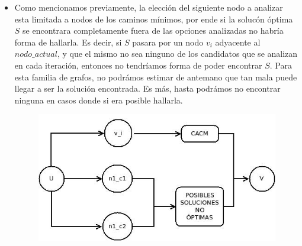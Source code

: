 \begin{itemize}
\item Como mencionamos previamente, la elecci\'on del siguiente nodo a analizar esta limitada a nodos de los caminos m\'inimos, por ende si la soluc\'on \'optima $S$ se encontrara completamente fuera de las opciones analizadas no habr\'ia forma de hallarla. Es decir, si $S$ pasara por un nodo $v_i$ adyacente al $nodo\_actual$, y que el mismo no sea ninguno de los candidatos que se analizan en cada iteraci\'on, entonces no tendr\'iamos forma de poder encontrar $S$. 
Para esta familia de grafos, no podr\'amos estimar de antemano que tan mala puede llegar a ser la soluci\'on encontrada. Es m\'as, hasta podr\'amos no encontrar ninguna en casos donde si era posible hallarla.
\begin{figure}[!hp]
	\centering
 	\includegraphics[scale=0.6]{img/familia_greedy.jpeg}
\end{figure}
\end{itemize}
